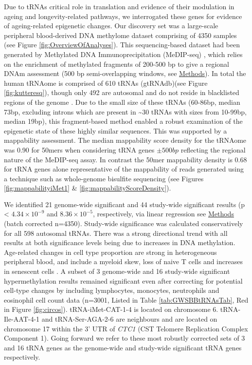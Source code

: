 \documentclass[]{book}
\begin{document}
Due to tRNAs critical role in translation and evidence of their modulation in ageing and longevity-related pathways, we interrogated these genes for evidence of ageing-related epigenetic changes.
Our discovery set was a large-scale peripheral blood-derived DNA methylome dataset comprising of 4350 samples (see Figure \ref{fig:OverviewOfAnalyses}).
This sequencing-based dataset had been generated by Methylated DNA Immunoprecipitation (MeDIP-seq) \citep{Down2009}, which relies on the enrichment of methylated fragments of 200-500 bp to give a regional DNAm assessment (500 bp semi-overlapping windows, see \protect\hyperlink{EpiTwinsMethods}{Methods}).
In total the human tRNAome is comprised of 610 tRNAs (gtRNAdb)(see Figure \ref{fig:kutteresq}), though only 492 are autosomal and do not reside in blacklisted regions of the genome \citep{Amemiya2019}.
Due to the small size of these tRNAs (60-86bp, median 73bp, excluding introns which are present in \textasciitilde30 tRNAs with sizes from 10-99bp, median 19bp), this fragment-based method enabled a robust examination of the epigenetic state of these highly similar sequences.
This was supported by a mappability assessment.
The median mappability score density for the tRNAome was 0.90 for 50mers when considering tRNA genes \(\pm500bp\) reflecting the regional nature of the MeDIP-seq assay.
In contrast the 50mer mappability density is 0.68 for tRNA genes alone representative of the mappability of reads generated using a technique such as whole-genome bisulfite sequencing (see Figures \ref{fig:mappabilityiMet1} \& \ref{fig:mappabilityScoreDensity}).

We identified 21 genome-wide significant and 44 study-wide significant results (p \textless{} \(4.34\times10^{-9}\) and \(8.36\times10^{-5}\), respectively, via linear regression see \protect\hyperlink{medipmodels}{Methods} (batch corrected n=4350).
Study-wide significance was calculated conservatively for all 598 autosomal tRNAs.
There was a strong directional trend with all results at both significance levels being due to increases in DNA methylation.
Age-related changes in cell type proportion are strong in heterogeneous peripheral blood, and include a myeloid skew, loss of naive T cells and increases in senescent cells \citep{Geiger2013}.
A subset of 3 genome-wide and 16 study-wide significant hypermethylation results remained significant even after correcting for potential cell-type changes by including lymphocytes, monocytes, neutrophils and eosinophil cell count data (n=3001, Listed in Table \ref{tab:GWSBBtRNAsTab}, Red in Figure \ref{fig:circos}).
tRNA-iMet-CAT-1-4 is located on chromosome 6.
tRNA-Ile-AAT-4-1 and tRNA-Ser-AGA-2-6 are neighbours and are located on chromosome 17 within the 3' UTR of \emph{CTC1} (CST Telomere Replication Complex Component 1).
Going forward we refer to these most robustly corrected sets of 3 and 16 tRNA genes as the genome-wide and study-wide significant tRNA genes respectively.
\end{document}
